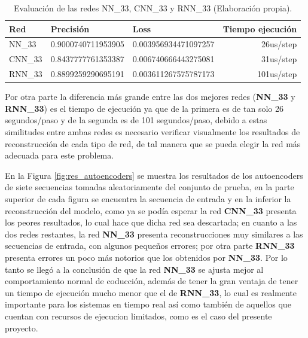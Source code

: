 \begin{table}[H]
\centering
\begin{center}
\begin{tabular}{|l|r|r|r|}
\hline
\textbf{Red} & \multicolumn{1}{l|}{\textbf{Precisi\'{o}n}} & \multicolumn{1}{l|}{\textbf{Loss}} & \multicolumn{1}{l|}{\textbf{Tiempo ejecuci\'{o}n}} \\ \hline
NN\_33              & 0.9000740711953905  & 0.003956934471097257  & 26us/step  \\ \hline
CNN\_33             & 0.8437777761353387  & 0.006740666443275081  & 31us/step  \\ \hline
RNN\_33             & 0.8899259290695191  & 0.003611267575787173  & 101us/step \\ \hline
\end{tabular}
\end{center}
\caption{Evaluaci\'{o}n de las redes NN\_33, CNN\_33 y RNN\_33  (Elaboraci\'{o}n propia).}
\label{table:evaluacion_redes}
\end{table}

Por otra parte la diferencia m\'{a}s grande entre las dos mejores redes (\textbf{NN\_33} y \textbf{RNN\_33}) es el tiempo de ejecuci\'{o}n ya que de la primera es de tan solo 26 segundos/paso y de la segunda es de 101 segundos/paso, debido a estas similitudes entre ambas redes es necesario verificar visualmente los resultados de reconstrucci\'{o}n de cada tipo de red, de tal manera que se pueda elegir la red m\'{a}s adecuada para este problema. 

\vspace{5mm} %

En la Figura \ref{fig:res_autoencoders} se muestra los resultados de los autoencoders de siete secuencias tomadas aleatoriamente del conjunto de prueba, en la parte superior de cada figura se encuentra la secuencia de entrada y en la inferior la reconstrucci\'{o}n del modelo, como ya se pod\'{i}a esperar la red \textbf{CNN\_33} presenta los peores resultados, lo cual hace que dicha red sea descartada; en cuanto a las dos redes restantes, la red \textbf{NN\_33} presenta reconstrucciones muy similares a las secuencias de entrada, con algunos peque\~{n}os errores; por otra parte \textbf{RNN\_33} presenta errores un poco m\'{a}s notorios que los obtenidos por  \textbf{NN\_33}. Por lo tanto se lleg\'{o} a la conclusi\'{o}n de que la red \textbf{NN\_33} se ajusta mejor al comportamiento normal de coducci\'{o}n, adem\'{a}s de tener la gran ventaja de tener un tiempo de ejecuci\'{o}n mucho menor que el de \textbf{RNN\_33}, lo cual es realmente importante para los sistemas en tiempo real as\'{i} como tambi\'{e}n de aquellos que cuentan con recursos de ejecucion limitados, como es el caso del presente proyecto.

